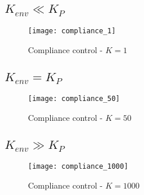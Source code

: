 \newpage

\subsection{$K_{env}\ll K_P$}

\begin{figure}[H]
\centering
\texttt{[image: compliance\_1]}
\caption{Compliance control - $K=1$}
\end{figure}


\subsection{$K_{env}= K_P$}

\begin{figure}[H]
\centering
\texttt{[image: compliance\_50]}
\caption{Compliance control - $K=50$}
\end{figure}


\subsection{$K_{env}\gg K_P$}

\begin{figure}[H]
\centering
\texttt{[image: compliance\_1000]}
\caption{Compliance control - $K=1000$}
\end{figure}